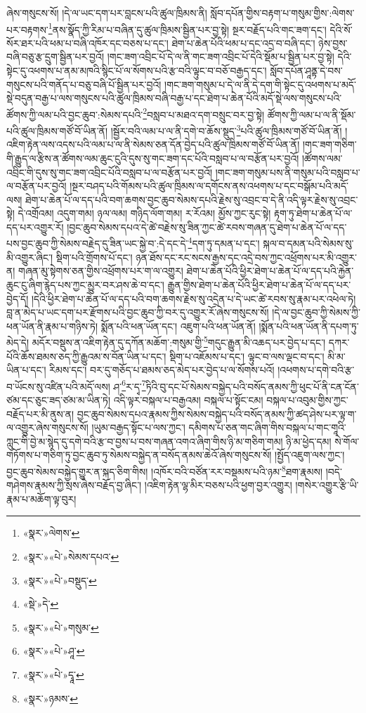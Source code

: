 ཞེས་གསུངས་སོ། །དེ་ལ་ཡང་དག་པར་བླངས་པའི་ཚུལ་ཁྲིམས་ནི། སློབ་དཔོན་གྱིས་བརྟག་པ་གསུམ་གྱིས་:ལེགས་པར་བརྟགས་\footnote{«སྣར་»ལེགས་}ནས་སྣོད་ཀྱི་རིམ་པ་བཞིན་དུ་ཚུལ་ཁྲིམས་སྦྱིན་པར་བྱ་སྟེ། སྔར་བརྗོད་པའི་གང་ཟག་དང་། དེའི་སོ་སོར་ཐར་པའི་ཕམ་པ་བཞི་འཁོར་དང་བཅས་པ་དང་། ཐེག་པ་ཆེན་པོའི་ཕམ་པ་དང་འདྲ་བ་བཞི་དང་། ཉེས་བྱས་བཞི་བཅུ་རྩ་དྲུག་སྦྱིན་པར་བྱའོ། །གང་ཟག་འབྲིང་པོ་དེ་ལ་ནི་གང་ཟག་འབྲིང་པོ་དེའི་སྡོམ་པ་སྦྱིན་པར་བྱ་སྟེ། དེའི་སྟེང་དུ་འཕགས་པ་ནམ་མཁའི་སྙིང་པོ་ལ་སོགས་པའི་རྩ་བའི་ལྟུང་བ་བཅོ་བརྒྱད་དང་། སློབ་དཔོན་ཤཱནྟ་དེ་བས་གསུངས་པའི་གནོད་པ་བཅུ་བཞི་པོ་སྦྱིན་པར་བྱའོ། །གང་ཟག་གསུམ་པ་དེ་ལ་ནི་དེ་དག་གི་སྟེང་དུ་འཕགས་པ་མདོ་སྡེ་བདུན་བརྒྱ་པ་ལས་གསུངས་པའི་ཚུལ་ཁྲིམས་བཞི་བརྒྱ་པ་དང་ཐེག་པ་ཆེན་པོའི་མདོ་སྡེ་ལས་གསུངས་པའི་ཚོགས་ཀྱི་ལམ་པའི་བྱང་ཆུབ་:སེམས་དཔའི་\footnote{«སྣར་»«པེ་»སེམས་དཔའ་}བསླབ་པ་མཐའ་དག་བསྲུང་བར་བྱ་སྟེ། ཚོགས་ཀྱི་ལམ་པ་ལ་ནི་སྡོམ་པའི་ཚུལ་ཁྲིམས་གཙོ་བོ་ཡིན་ནོ། །སྦྱོར་བའི་ལམ་པ་ལ་ནི་དགེ་བ་ཆོས་སྡུད་\footnote{«སྣར་»«པེ་»བསྡུད་}པའི་ཚུལ་ཁྲིམས་གཙོ་བོ་ཡིན་ནོ། །འཇིག་རྟེན་ལས་འདས་པའི་ལམ་པ་ལ་ནི་སེམས་ཅན་དོན་བྱེད་པའི་ཚུལ་ཁྲིམས་གཙོ་བོ་ཡིན་ནོ། །གང་ཟག་གཅིག་གི་རྒྱུད་ལ་རྩིས་ན་ཚོགས་ལམ་ཆུང་ངུའི་དུས་སུ་གང་ཟག་དང་པོའི་བསླབ་པ་ལ་བརྩོན་པར་བྱའོ། །ཚོགས་ལམ་འབྲིང་གི་དུས་སུ་གང་ཟག་འབྲིང་པོའི་བསླབ་པ་ལ་བརྩོན་པར་བྱའོ། །གང་ཟག་གསུམ་པས་ནི་གསུམ་པའི་བསླབ་པ་ལ་བརྩོན་པར་བྱའོ། །སྔར་བཤད་པའི་གོམས་པའི་ཚུལ་ཁྲིམས་ལ་དགོངས་ནས་འཕགས་པ་དང་བསྒོམ་པའི་མདོ་ལས། ཐེག་པ་ཆེན་པོ་ལ་དད་པའི་བག་ཆགས་བྱང་ཆུབ་སེམས་དཔའི་རྗེས་སུ་འབྲང་བ་དེ་ནི་འདི་ལྟར་རྗེས་སུ་འབྲང་སྟེ། དེ་འགྲོའམ། འདུག་གམ། ཉལ་ལམ། གཉིད་ལོག་གམ། ར་རོའམ། མྱོས་ཀྱང་རུང་སྟེ། རྟག་ཏུ་ཐེག་པ་ཆེན་པོ་ལ་དད་པར་འགྱུར་རོ། །བྱང་ཆུབ་སེམས་དཔའ་དེ་ཚེ་བརྗེས་སུ་ཟིན་ཀྱང་ཚེ་རབས་གཞན་དུ་ཐེག་པ་ཆེན་པོ་ལ་དད་པས་བྱང་ཆུབ་ཀྱི་སེམས་བརྗེད་དུ་ཟིན་ཡང་སྐྱེ་བ་:དེ་དང་དེ་\footnote{«སྡེ་»དེ་}དག་ཏུ་དམན་པ་དང་། སྐལ་བ་དམན་པའི་སེམས་སུ་མི་འགྱུར་ཞིང་། སྡིག་པའི་གྲོགས་པོ་དང་། ཉན་ཐོས་དང་རང་སངས་རྒྱས་དང་འདྲེ་བས་ཀྱང་འཕྲོགས་པར་མི་འགྱུར་ན། གཞན་མུ་སྟེགས་ཅན་གྱིས་འཕྲོགས་པར་ག་ལ་འགྱུར། ཐེག་པ་ཆེན་པོའི་ཕྱིར་ཐེག་པ་ཆེན་པོ་ལ་དད་པའི་རྐྱེན་ཆུང་ངུ་ཞིག་རྙེད་པས་ཀྱང་མྱུར་བར་ཤས་ཆེ་བ་དང་། རྒྱུན་གྱིས་ཐེག་པ་ཆེན་པོའི་ཕྱིར་ཐེག་པ་ཆེན་པོ་ལ་དད་པར་བྱེད་དོ། །དེའི་ཕྱིར་ཐེག་པ་ཆེན་པོ་ལ་དད་པའི་བག་ཆགས་རྗེས་སུ་འདྲེན་པ་དེ་ཡང་ཚེ་རབས་སུ་རྣམ་པར་འཕེལ་ཏེ། བླ་ན་མེད་པ་ཡང་དག་པར་རྫོགས་པའི་བྱང་ཆུབ་ཀྱི་བར་དུ་འགྱུར་རོ་ཞེས་གསུངས་སོ། །དེ་ལ་བྱང་ཆུབ་ཀྱི་སེམས་ཀྱི་ཕན་ཡོན་ནི་རྣམ་པ་གཉིས་ཏེ། སྨོན་པའི་ཕན་ཡོན་དང་། འཇུག་པའི་ཕན་ཡོན་ནོ། །སྨོན་པའི་ཕན་ཡོན་ནི་དཔག་ཏུ་མེད་དེ། མདོར་བསྡུས་ན་འཇིག་རྟེན་དུ་དཀོན་མཆོག་:གསུམ་གྱི་\footnote{«སྣར་»«པེ་»གསུམ་}གདུང་རྒྱུན་མི་འཆད་པར་བྱེད་པ་དང་། དཀར་པོའི་ཆོས་ཐམས་ཅད་ཀྱི་རྒྱུའམ་ས་བོན་ཡིན་པ་དང་། སྡིག་པ་འཇོམས་པ་དང་། ལྟུང་བ་ལས་ལྡང་བ་དང་། མི་མ་ཡིན་པ་དང་། རིམས་དང་། བར་དུ་གཅོད་པ་ཐམས་ཅད་མེད་པར་བྱེད་པ་ལ་སོགས་པའོ། །འཕགས་པ་དགེ་བའི་རྩ་བ་ཡོངས་སུ་འཛིན་པའི་མདོ་ལས། ཤ་\footnote{«སྣར་»«པེ་»ཤཱ་}ར་དྭ་\footnote{«སྣར་»«པེ་»དྭཱ་}ཏིའི་བུ་དང་པོ་སེམས་བསྐྱེད་པའི་བསོད་ནམས་ཀྱི་ཕུང་པོ་ནི་ངན་ངོན་ཙམ་དང་ཅུང་ཟད་ཙམ་མ་ཡིན་ཏེ། འདི་ལྟར་བསྐལ་པ་བརྒྱའམ། བསྐལ་པ་སྟོང་ངམ། བསྐལ་པ་འབུམ་གྱིས་ཀྱང་བརྗོད་པར་མི་ནུས་ན། བྱང་ཆུབ་སེམས་དཔའ་རྣམས་ཀྱིས་སེམས་བསྐྱེད་པའི་བསོད་ནམས་ཀྱི་ཚད་ཤེས་པར་ལྟ་ག་ལ་འགྱུར་ཞེས་གསུངས་སོ། །ཡུམ་བརྒྱད་སྟོང་པ་ལས་ཀྱང་། དམིགས་པ་ཅན་གང་ཞིག་གིས་བསྐལ་པ་གང་གཱའི་ཀླུང་གི་བྱེ་མ་སྙེད་དུ་དགེ་བའི་རྩ་བ་བྱས་པ་བས་གཞན་འགའ་ཞིག་གིས་ཉི་མ་གཅིག་གམ། ཉི་མ་ཕྱེད་དམ། སེ་གོལ་གཏོགས་པ་གཅིག་ཏུ་བྱང་ཆུབ་ཏུ་སེམས་བསྐྱེད་ན་བསོད་ནམས་ཆེའོ་ཞེས་གསུངས་སོ། །སྤྱོད་འཇུག་ལས་ཀྱང་། བྱང་ཆུབ་སེམས་བསྐྱེད་གྱུར་ན་སྐད་ཅིག་གིས། །འཁོར་བའི་བཙོན་རར་བསྡམས་པའི་ཉམ་\footnote{«སྣར་»ཉམས་}ཐག་རྣམས། །བདེ་གཤེགས་རྣམས་ཀྱི་སྲས་ཞེས་བརྗོད་བྱ་ཞིང་། །འཇིག་རྟེན་ལྷ་མིར་བཅས་པའི་ཕྱག་བྱར་འགྱུར། །གསེར་འགྱུར་རྩི་ཡི་རྣམ་པ་མཆོག་ལྟ་བུར། 